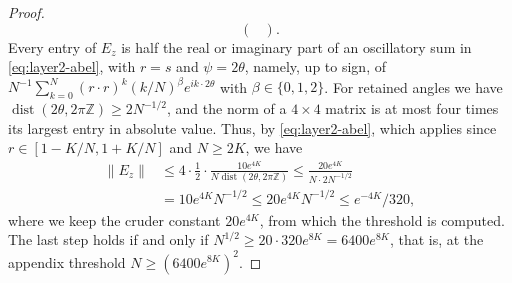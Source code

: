 \begin{proof}
\[\begin{pmatrix}
 \end{pmatrix}.
\]
\endgroup
Every entry of $E_z$ is half the real or imaginary part of an
oscillatory sum in \eqref{eq:layer2-abel}, with $r=s$ and $\psi=2\theta$,
namely, up to sign, of
$N^{-1}\sum_{k=0}^N(r\cdot r)^k(k/N)^\beta e^{ik\cdot2\theta}$ with
$\beta\in\{0,1,2\}$.
For retained angles we have
$\operatorname{dist}(2\theta,2\pi\mathbb Z)\ge2N^{-1/2}$, and the norm of a
$4\times4$ matrix is at most four times its largest entry in absolute
value. Thus, by \eqref{eq:layer2-abel}, which applies since
$r\in[1-K/N,1+K/N]$ and $N\ge2K$, we have
\begin{align*}
 \|E_z\|&\le4\cdot\frac12\cdot
   \frac{10e^{4K}}{N\operatorname{dist}(2\theta,2\pi\mathbb Z)}
 \le\frac{20e^{4K}}{N\cdot2N^{-1/2}}\\
 &=10e^{4K}N^{-1/2}
 \le20e^{4K}N^{-1/2}
 \le e^{-4K}/320,
\end{align*}
where we keep the cruder constant $20e^{4K}$, from which the threshold is
computed. The last step holds if and only if
$N^{1/2}\ge20\cdot320e^{8K}=6400e^{8K}$, that is, at the appendix threshold
$N\ge(6400e^{8K})^2$.


\end{proof}
